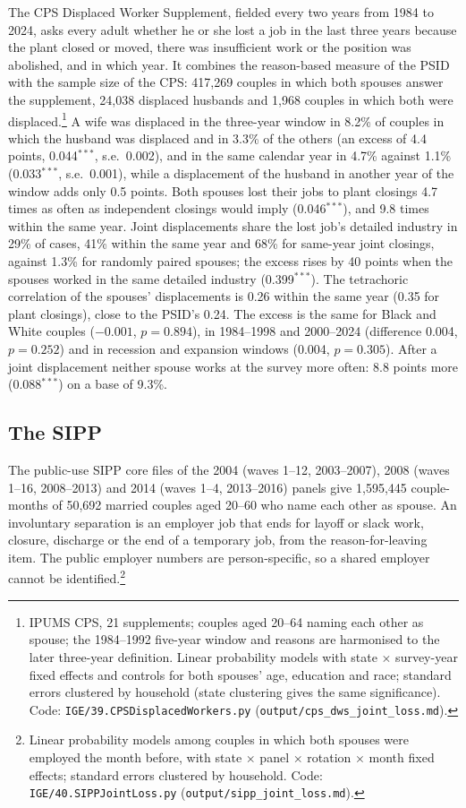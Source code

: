 The CPS Displaced Worker Supplement, fielded every two years from 1984 to 2024, asks every adult whether he or she lost
a job in the last three years because the plant closed or moved, there was insufficient work or the position was
abolished, and in which year. It combines the reason-based measure of the PSID with the sample size of the CPS: 417,269
couples in which both spouses answer the supplement, 24,038 displaced husbands and 1,968 couples in which both were
displaced.\footnote{IPUMS CPS, 21 supplements; couples aged 20--64 naming each other as spouse; the 1984--1992 five-year
window and reasons are harmonised to the later three-year definition. Linear probability models with state $\times$
survey-year fixed effects and controls for both spouses' age, education and race; standard errors clustered by
household (state clustering gives the same significance). Code: \texttt{IGE/39.CPSDisplacedWorkers.py}
(\texttt{output/cps\_dws\_joint\_loss.md}).} A wife was displaced in the three-year window in 8.2\% of couples in which
the husband was displaced and in 3.3\% of the others (an excess of 4.4 points, 0.044$^{***}$, s.e.\ 0.002), and in the same
calendar year in 4.7\% against 1.1\% (0.033$^{***}$, s.e.\ 0.001), while a displacement of the husband in another year of
the window adds only 0.5 points. Both spouses lost their jobs to plant closings 4.7 times as often as independent
closings would imply (0.046$^{***}$), and 9.8 times within the same year. Joint displacements share the lost job's
detailed industry in 29\% of cases, 41\% within the same year and 68\% for same-year joint closings, against 1.3\% for
randomly paired spouses; the excess rises by 40 points when the spouses worked in the same detailed industry
(0.399$^{***}$). The tetrachoric correlation of the spouses' displacements is 0.26 within the same year (0.35 for plant
closings), close to the PSID's 0.24. The excess is the same for Black and White couples ($-0.001$, $p=0.894$), in
1984--1998 and 2000--2024 (difference 0.004, $p=0.252$) and in recession and expansion windows (0.004, $p=0.305$). After
a joint displacement neither spouse works at the survey more often: 8.8 points more (0.088$^{***}$) on a base of 9.3\%.

\subsection{The SIPP}

The public-use SIPP core files of the 2004 (waves 1--12, 2003--2007), 2008 (waves 1--16, 2008--2013) and 2014
(waves 1--4, 2013--2016) panels give 1,595,445 couple-months of 50,692 married couples aged 20--60 who name each other
as spouse. An involuntary separation is an employer job that ends for layoff or slack work, closure, discharge or the end
of a temporary job, from the reason-for-leaving item. The public employer numbers are person-specific, so a shared
employer cannot be identified.\footnote{Linear probability models among couples in which both spouses were employed the
month before, with state $\times$ panel $\times$ rotation $\times$ month fixed effects; standard errors clustered by
household. Code: \texttt{IGE/40.SIPPJointLoss.py} (\texttt{output/sipp\_joint\_loss.md}).}


